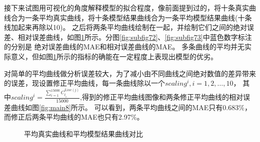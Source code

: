 \documentclass{article}
\begin{document}
接下来试图用可视化的角度解释模型的拟合程度，像前面提到过的，将十条真实曲线合为一条平均真实曲线，将十条模型结果曲线合为一条平均模型结果曲线(十条线加起来再除以10)。
之后将两条平均曲线绘制在一起，并绘制它们之间的绝对误差、相对误差曲线，如图\ref{fig:main7}所示。分图\ref{fig:subfig72}、\ref{fig:subfig73}中蓝色数字标注的分别是
绝对误差曲线的MAE和相对误差曲线的MAE。
多条曲线的平均并无实际意义，但如图\ref{fig:main7}所示的指标的确能在一定程度上表现出模型的优劣。

对简单的平均曲线做分析误差较大，为了减小由不同曲线之间绝对数值的差异带来的误差，现设置修正平均曲线，每一条曲线除以一个$scaling^i,i=1,2,\dots,10$，
其中$scaling^i = \frac{\sum_{i = 1}^{15000} C^{Line(j)}_{t_{i}}}{15000}$,得到的修正平均曲线图像和两条修正平均曲线的相对误差曲线如图\ref{fig:main8}所示。
可以看到，两条平均曲线之间的MAE只有0.683\%，而修正后两条平均曲线的MAE也只有2.97\%。


\begin{figure}
  \centering
  \caption{平均真实曲线和平均模型结果曲线对比}
  \label{fig:main7}
\end{figure}
\end{document}
